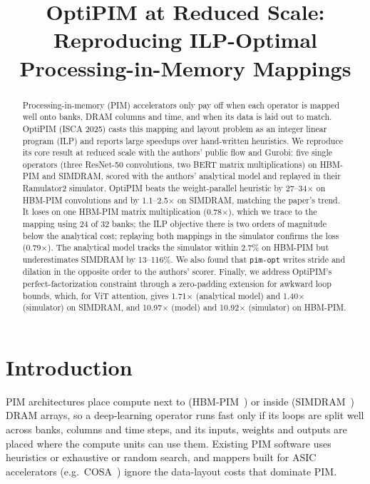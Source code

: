 \documentclass[conference]{IEEEtran}
\begin{document}
\title{OptiPIM at Reduced Scale: Reproducing ILP-Optimal\\Processing-in-Memory Mappings}

\author{
}

\maketitle

\begin{abstract}
Processing-in-memory (PIM) accelerators only pay off when each operator is
mapped well onto banks, DRAM columns and time, and when its data is laid out to
match. OptiPIM (ISCA 2025) casts this mapping and layout problem as an integer
linear program (ILP) and reports large speedups over hand-written heuristics.
We reproduce its core result at reduced scale with the authors' public flow and
Gurobi: five single operators (three ResNet-50 convolutions, two BERT matrix
multiplications) on HBM-PIM and SIMDRAM, scored with the authors' analytical
model and replayed in their Ramulator2 simulator. OptiPIM beats the
weight-parallel heuristic by 27--34$\times$ on HBM-PIM convolutions and by
1.1--2.5$\times$ on SIMDRAM, matching the paper's trend. It loses on one
HBM-PIM matrix multiplication (0.78$\times$), which we trace to the mapping using
24 of 32 banks; the ILP objective there is two orders of magnitude below the
analytical cost; replaying both mappings in the simulator confirms the loss
(0.79$\times$). The analytical model tracks the simulator within 2.7\% on
HBM-PIM but underestimates SIMDRAM by 13--116\%. We also found that
\texttt{pim-opt} writes stride and dilation in the opposite order to the
authors' scorer. Finally, we address OptiPIM's perfect-factorization constraint through a zero-padding extension for awkward loop bounds, which, for ViT attention, gives 1.71$\times$ (analytical model) and 1.40$\times$ (simulator) on SIMDRAM, and 10.97$\times$ (model) and 10.92$\times$ (simulator) on HBM-PIM.
\end{abstract}

\section{Introduction}
PIM architectures place compute next to (HBM-PIM~\cite{hbmpim}) or inside
(SIMDRAM~\cite{simdram}) DRAM arrays, so a deep-learning operator runs fast only
if its loops are split well across banks, columns and time steps, and its
inputs, weights and outputs are placed where the compute units can use them.
Existing PIM software uses heuristics or exhaustive or random search, and
mappers built for ASIC accelerators (e.g.\ COSA~\cite{cosa}) ignore the
data-layout costs that dominate PIM.
\end{document}
